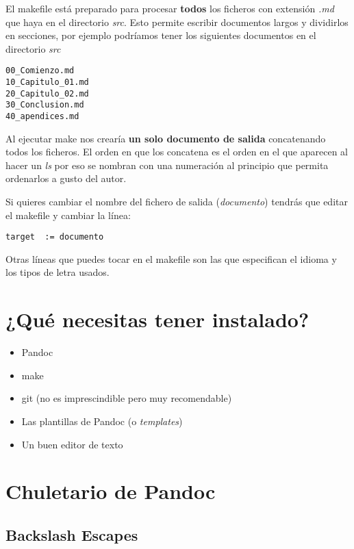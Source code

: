 \documentclass[12pt,spanish,]{article}
\providecommand{\tightlist}{%
  \setlength{\itemsep}{0pt}\setlength{\parskip}{0pt}}
\begin{document}
El makefile está preparado para procesar \textbf{todos} los ficheros con
extensión \emph{.md} que haya en el directorio \emph{src}. Esto permite
escribir documentos largos y dividirlos en secciones, por ejemplo
podríamos tener los siguientes documentos en el directorio \emph{src}

\begin{verbatim}
00_Comienzo.md
10_Capitulo_01.md
20_Capitulo_02.md
30_Conclusion.md
40_apendices.md
\end{verbatim}

Al ejecutar make nos crearía \textbf{un solo documento de salida}
concatenando todos los ficheros. El orden en que los concatena es el
orden en el que aparecen al hacer un \emph{ls} por eso se nombran con
una numeración al principio que permita ordenarlos a gusto del autor.

Si quieres cambiar el nombre del fichero de salida (\emph{documento})
tendrás que editar el makefile y cambiar la línea:

\begin{verbatim}
target  := documento
\end{verbatim}

Otras líneas que puedes tocar en el makefile son las que especifican el
idioma y los tipos de letra usados.

\section{¿Qué necesitas tener
instalado?}\label{quuxe9-necesitas-tener-instalado}

\begin{itemize}
\tightlist
\item
  Pandoc
\item
  make
\item
  git (no es imprescindible pero muy recomendable)
\item
  Las plantillas de Pandoc (o \emph{templates})
\item
  Un buen editor de texto
\end{itemize}

\section{Chuletario de Pandoc}\label{chuletario-de-pandoc}

\subsection{Backslash Escapes}\label{backslash-escapes}
\end{document}
